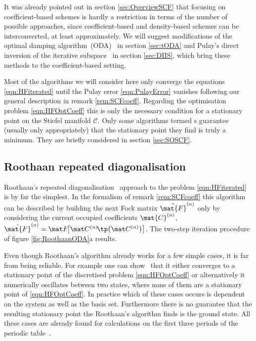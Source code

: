 \pagebreak
It was already pointed out in section \vref{sec:OverviewSCF}
that focusing on coefficient-based schemes
is hardly a restriction in terms of the number of possible approaches,
since coefficient-based and density-based schemes can be interconverted,
at least approximately.
We will suggest modifications of the
optimal damping algorithm~(ODA)~\cite{Cances2000a} in section \ref{sec:tODA}
and Pulay's direct inversion of the iterative subspace~\cite{Pulay1982}
in section \ref{sec:DIIS},
which bring these methods to the coefficient-based setting.

Most of the \SCF algorithms we will consider here
only converge the \HF equations \eqref{eqn:HFiterated}
until the Pulay error \eqref{eqn:PulayError} vanishes
following our general description in remark \vref{rem:SCFcoeff}.
Regarding the \HF optimisation problem \eqref{eqn:HFOptCoeff}
this is only the necessary condition for a stationary point on the Stiefel
manifold $\mathcal{C}$.
Only some \SCF algorithms
termed s
guarantee (usually only appropriately)
that the stationary point they find is truly a minimum.
They are briefly considered in section \ref{sec:SOSCF}.

\subsection{Roothaan repeated diagonalisation}
\label{sec:RoothaanRepeatedDiag}

Roothaan's repeated diagonalisation~\cite{Roothaan1951}
approach to the \HF problem \eqref{eqn:HFiterated} is by far the simplest.
In the formalism of remark \vref{rem:SCFcoeff}
this algorithm can be described by building the next Fock matrix
$\tilde{\mat{F}}^{(n)}$ only by considering
the current occupied coefficients $\mat{C}^{(n)}$,
\ie $\tilde{\mat{F}}^{(n)} = \matFnfull$.
The two-step iteration procedure of figure \vref{fig:RoothaanODA}a results.

Even though Roothaan's algorithm already works for a few simple cases,
it is far from being reliable.
For example one can show~\cite{Cances2000,Cances2000b} that it
either converges to a stationary point of the
discretised \HF problem \eqref{eqn:HFOptCoeff}
or alternatively it numerically oscillates between two states,
where none of them are a stationary point of \eqref{eqn:HFOptCoeff}.
In practice which of these cases occurs is dependent on the system
as well as the basis set.
Furthermore there is no guarantee that the resulting stationary point
the Roothaan's algorithm finds is the \HF ground state.
All these cases are already found for \HF calculations
on the first three periods of the periodic table~\cite{Cances2000}.

